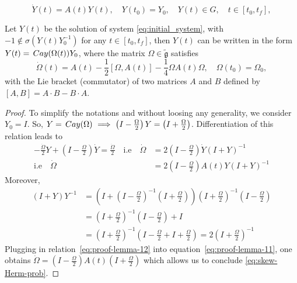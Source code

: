 \documentclass[10pt,a4paper]{amsart}
\newcommand{\Cay}{\,{\rm Cay}}
\newcommand{\Om}{\Omega}
\begin{document}
\begin{equation}
\label{eq:initial_system}
\dot{Y}(t) = A(t)Y(t), \quad Y(t_0) = Y_0, \quad Y(t) \in G, \quad t \in [t_0, t_f],
\end{equation}

\begin{lemma}
\label{lemma:1}
Let $Y(t)$ be the solution of system \eqref{eq:initial_system}, with $-1 \notin \sigma(Y(t)Y_0^{-1})$ for any $t \in [t_0,t_f]$,
then $Y(t)$ can be written in the form $Y(t) = \Cay(\Om(t))Y_0$, where the matrix $\Om \in \tilde{\mathfrak g}$ satisfies 
%
\begin{equation}
\label{eq:skew-Herm-prob}
\dot{\Om}(t) = A(t) - \frac{1}{2}[\Om, A(t)] - \frac{1}{4}\Om A(t) \Om, \quad \Om(t_0) = \Om_0, 
\end{equation}
%
with the Lie bracket (commutator) of two matrices $A$ and $B$ defined by $[A,B] = A\cdot B - B\cdot A$.
\end{lemma}

\begin{proof}
To simplify the notations and without loosing any generality, we consider $Y_0 = I$. 
So,
$Y = \Cay(\Om) ~ \Longrightarrow ~ \left(I - \frac{\Om}{2}\right) Y = \left(I + \frac{\Om}{2}\right)$. Differentiation of this relation leads to
%
\begin{equation}
\label{eq:proof-lemma-11}
\begin{aligned}
- \frac{\dot\Om}{2} Y + \left(I - \frac{\Om}{2}\right) \dot Y  = \frac{\dot\Om}{2} \quad
\text{i.e} \quad \dot \Om &= 2 \left(I - \frac{\Om}{2} \right) \dot Y  \left(I + Y\right)^{-1} \\
\text{i.e} \quad \dot \Omega &= 2 \left(I - \frac{\Om}{2}\right) A(t)Y \left(I + Y \right)^{-1} 
\end{aligned}
\end{equation}
%
Moreover,
%
\begin{equation}
\label{eq:proof-lemma-12}
\begin{aligned}
\left(I + Y \right) Y^{-1} &= \left(I +  \left(I - \frac{\Om}{2} \right)^{-1}  \left(I + \frac{\Om}{2} \right) \right)\left(I + \frac{\Om}{2} \right)^{-1}  \left(I - \frac{\Om}{2} \right)\\
&= \left(I + \frac{\Om}{2} \right)^{-1} \left(I - \frac{\Om}{2} \right) + I \\
&= \left(I + \frac{\Om}{2} \right)^{-1}\left(I - \frac{\Om}{2} + I + \frac{\Om}{2} \right) = 2 \left(I + \frac{\Om}{2} \right)^{-1}
\end{aligned}
\end{equation}
%
Plugging in relation~\eqref{eq:proof-lemma-12} into equation~\eqref{eq:proof-lemma-11}, one obtains
%
$
\dot\Omega = \left(I - \frac{\Om}{2}\right) A(t) \left(I + \frac{\Om}{2} \right) 
$
which allows us to conclude \eqref{eq:skew-Herm-prob}.
\end{proof}
\end{document}
